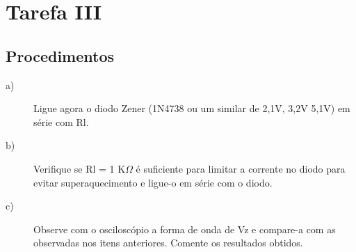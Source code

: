 \section{Tarefa III}
\subsection{Procedimentos}
\begin{description}
	\item[a)] Ligue agora o diodo Zener (1N4738 ou um similar de 2,1V, 3,2V 5,1V) em série com Rl.
	\item[b)] Verifique se Rl = 1 K$\Omega$ é suficiente para limitar a corrente no diodo para evitar superaquecimento e ligue-o em série com o diodo.
	\item[c)] Observe com o osciloscópio a forma de onda de Vz e compare-a com as observadas nos itens anteriores. Comente os resultados obtidos.
\end{description}

